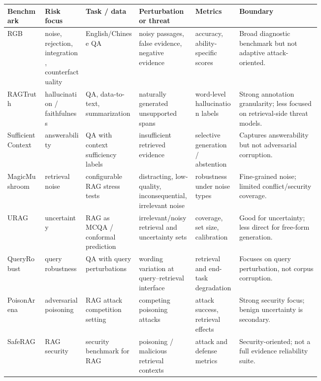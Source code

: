 \begin{table}[t]
\centering
\scriptsize
\renewcommand{\arraystretch}{0.95}
\begin{tabularx}{\linewidth}{>{\raggedright\arraybackslash}p{0.12\linewidth}>{\raggedright\arraybackslash}p{0.13\linewidth}>{\raggedright\arraybackslash}p{0.17\linewidth}>{\raggedright\arraybackslash}p{0.18\linewidth}>{\raggedright\arraybackslash}p{0.14\linewidth}X}
\toprule
\textbf{Benchmark} & \textbf{Risk focus} & \textbf{Task / data} & \textbf{Perturbation or threat} & \textbf{Metrics} & \textbf{Boundary} \\
\midrule
RGB \citep{rgb2023} & noise, rejection, integration, counterfactuality & English/Chinese QA & noisy passages, false evidence, negative evidence & accuracy, ability-specific scores & Broad diagnostic benchmark but not adaptive attack-oriented. \\
RAGTruth \citep{ragTruth2024} & hallucination / faithfulness & QA, data-to-text, summarization & naturally generated unsupported spans & word-level hallucination labels & Strong annotation granularity; less focused on retrieval-side threat models. \\
Sufficient Context \citep{sufficientContext2024} & answerability & QA with context sufficiency labels & insufficient retrieved evidence & selective generation / abstention & Captures answerability but not adversarial corruption. \\
MagicMushroom \citep{rrag027} & retrieval noise & configurable RAG stress tests & distracting, low-quality, inconsequential, irrelevant noise & robustness under noise types & Fine-grained noise; limited conflict/security coverage. \\
URAG \citep{rrag001} & uncertainty & RAG as MCQA / conformal prediction & irrelevant/noisy retrieval and uncertainty sets & coverage, set size, calibration & Good for uncertainty; less direct for free-form generation. \\
QueryRobust \citep{queryRobustness2025} & query robustness & QA with query perturbations & wording variation at query--retrieval interface & retrieval and end-task degradation & Focuses on query perturbation, not corpus corruption. \\
PoisonArena \citep{rrag023} & adversarial poisoning & RAG attack competition setting & competing poisoning attacks & attack success, retrieval effects & Strong security focus; benign uncertainty is secondary. \\
SafeRAG \citep{rrag019} & RAG security & security benchmark for RAG & poisoning / malicious retrieval contexts & attack and defense metrics & Security-oriented; not a full evidence reliability suite. \\

\end{tabularx}
\end{table}
